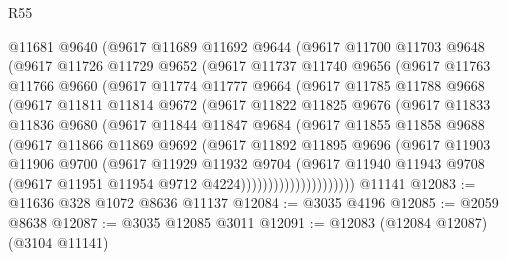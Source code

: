 \begin{lexlean}{R55}
\begin{coremodule}
          @11681
          @9640
          (@9617
            @11689
            @11692
            @9644
            (@9617
              @11700
              @11703
              @9648
              (@9617
                @11726
                @11729
                @9652
                (@9617
                  @11737
                  @11740
                  @9656
                  (@9617
                    @11763
                    @11766
                    @9660
                    (@9617
                      @11774
                      @11777
                      @9664
                      (@9617
                        @11785
                        @11788
                        @9668
                        (@9617
                          @11811
                          @11814
                          @9672
                          (@9617
                            @11822
                            @11825
                            @9676
                            (@9617
                              @11833
                              @11836
                              @9680
                              (@9617
                                @11844
                                @11847
                                @9684
                                (@9617
                                  @11855
                                  @11858
                                  @9688
                                  (@9617
                                    @11866
                                    @11869
                                    @9692
                                    (@9617
                                      @11892
                                      @11895
                                      @9696
                                      (@9617
                                        @11903
                                        @11906
                                        @9700
                                        (@9617
                                          @11929
                                          @11932
                                          @9704
                                          (@9617
                                            @11940
                                            @11943
                                            @9708
                                            (@9617 @11951 @11954 @9712 @4224)))))))))))))))))))))
    @11141
@12083 := @11636 @328 @1072 @8636 @11137
@12084 := @3035 @4196
@12085 := @2059 @8638
@12087 := @3035 @12085 @3011
@12091 := @12083 (@12084 @12087) (@3104 @11141)

\end{coremodule}
\end{lexlean}
